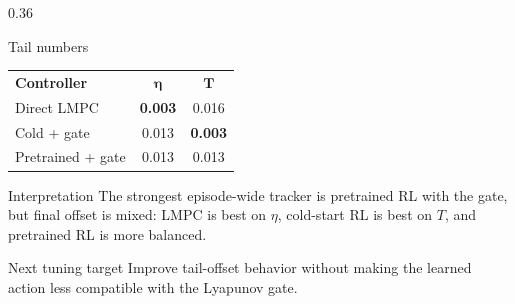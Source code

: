 \documentclass[aspectratio=169]{beamer}
\begin{document}
\begin{frame}
\begin{columns}[T,onlytextwidth]
\begin{column}{0.36\textwidth}
\begin{block}{Tail numbers}
\renewcommand{\arraystretch}{1.20}
\begin{tabular}{lcc}
\textbf{Controller} & \(\boldsymbol{\eta}\) & \(\boldsymbol{T}\) \\
Direct LMPC & \textbf{0.003} & 0.016 \\
Cold + gate & 0.013 & \textbf{0.003} \\
Pretrained + gate & 0.013 & 0.013
\end{tabular}
\end{block}

\vspace{0.06cm}
\begin{block}{Interpretation}
\justifying
The strongest episode-wide tracker is pretrained RL with the gate, but final offset is mixed: LMPC is best on \(\eta\), cold-start RL is best on \(T\), and pretrained RL is more balanced.
\end{block}

\vspace{0.06cm}
\begin{block}{Next tuning target}
\justifying
Improve tail-offset behavior without making the learned action less compatible with the Lyapunov gate.
\end{block}
\end{column}
\end{columns}

\end{frame}


\fi
\end{document}
